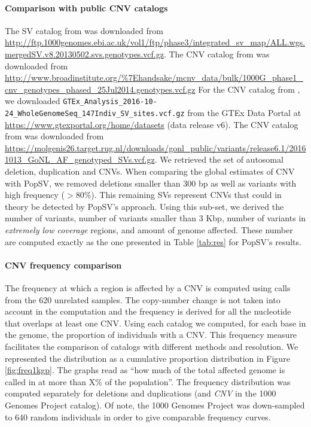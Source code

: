 \paragraph{Comparison with public CNV catalogs}
The SV catalog from \citet{Sudmant2015a} was downloaded from \url{http://ftp.1000genomes.ebi.ac.uk/vol1/ftp/phase3/integrated_sv_map/ALL.wgs.mergedSV.v8.20130502.svs.genotypes.vcf.gz}.
The CNV catalog from \citet{Handsaker2015} was downloaded from \url{http://www.broadinstitute.org/\%7Ehandsake/mcnv_data/bulk/1000G_phase1_cnv_genotypes_phased_25Jul2014.genotypes.vcf.gz}
For the CNV catalog from \citet{Chiang2017}, we downloaded \verb!GTEx_Analysis_2016-10-24_WholeGenomeSeq_147Indiv_SV_sites.vcf.gz! from the GTEx Data Portal at \url{https://www.gtexportal.org/home/datasets} (data release v6).
The CNV catalog from \citet{Francioli2014} was downloaded from \url{https://molgenis26.target.rug.nl/downloads/gonl_public/variants/release6.1/20161013_GoNL_AF_genotyped_SVs.vcf.gz}.
We retrieved the set of autosomal deletion, duplication and CNVs.
When comparing the global estimates of CNV with {\sf PopSV}, we removed deletions smaller than 300 bp as well as variants with high frequency ($>80\%$).
This remaining SVs represent CNVs that could in theory be detected by {\sf PopSV}'s approach.
Using this sub-set, we derived the number of variants, number of variants smaller than 3 Kbp, number of variants in {\it extremely low coverage} regions, and amount of genome affected.
These number are computed exactly as the one presented in Table \ref{tab:res} for {\sf PopSV}'s results.

\paragraph{CNV frequency comparison}
The frequency at which a region is affected by a CNV is computed using calls from the 620 unrelated samples.
The copy-number change is not taken into account in the computation and the frequency is derived for all the nucleotide that overlaps at least one CNV.
Using each catalog we computed, for each base in the genome, the proportion of individuals with a CNV.
This frequency measure facilitates the comparison of catalogs with different methods and resolution.
We represented the distribution as a cumulative proportion distribution in Figure \ref{fig:freq1kgp}.
The graphs read as ``how much of the total affected genome is called in at more than X\% of the population''.
The frequency distribution was computed separately for deletions and duplications (and {\it CNV} in the 1000 Genomes Project catalog).
Of note, the 1000 Genomes Project was down-sampled to 640 random individuals in order to give comparable frequency curves.

